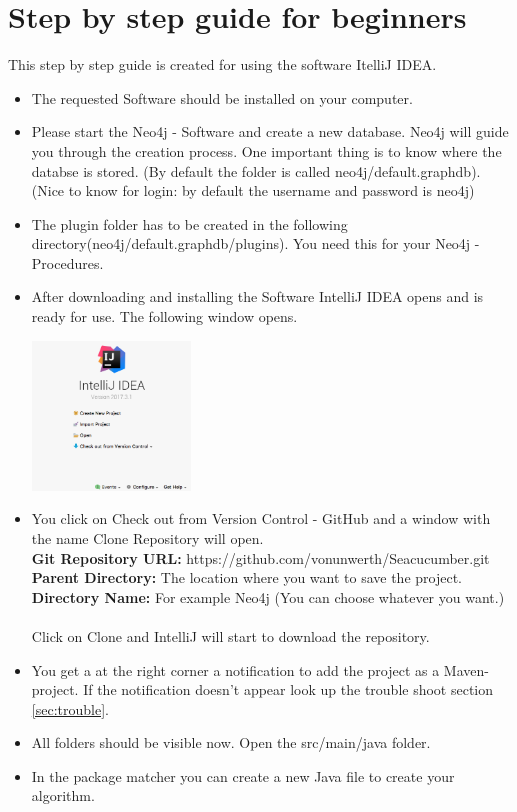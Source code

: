 \section{Step by step guide for beginners}\label{sec:stepByStepManual}
This step by step guide is created for using the software \glqq ItelliJ IDEA\grqq{}.
\begin{itemize}
	\item The requested Software should be installed on your computer.
	\item Please start the Neo4j - Software and create a new database. Neo4j will guide you through the creation process. One important thing is to know where the databse is stored. (By default the folder is called neo4j/default.graphdb). \\(Nice to know for login: by default the username and password is neo4j)
	\item The plugin folder has to be created in the following directory(neo4j/default.graphdb/plugins). You need this for your \glqq  Neo4j - Procedures\grqq{}.
	\newpage
	\item After downloading and installing the Software \glqq IntelliJ IDEA\grqq{} opens and is ready for use. The following window opens. \\
	\begin{center}
		\includegraphics[width=4.2cm]{common/IntelliJstart.png}\setlength{\unitlength}{1mm}
	\end{center}

	\item You click on \glqq Check out from Version Control - GitHub\grqq{} and a window with the name \glqq Clone Repository\grqq{} will open. \\
	\textbf{Git Repository URL:} https://github.com/vonunwerth/Seacucumber.git \\
	\textbf{Parent Directory:} The location where you want to save the project.  \\
	\textbf{Directory Name:} For example Neo4j (You can choose whatever you want.)\\
	\\
	Click on Clone and IntelliJ will start to download the repository.
	
	\item You get a at the right corner a notification to add the project as a Maven-project. If the notification doesn't appear look up the trouble shoot section \ref{sec:trouble}.
	
	\item All folders should be visible now. Open the src/main/java folder.
	\item In the \glqq package matcher\grqq{} you can create a new Java file to create your algorithm.
\end{itemize}

